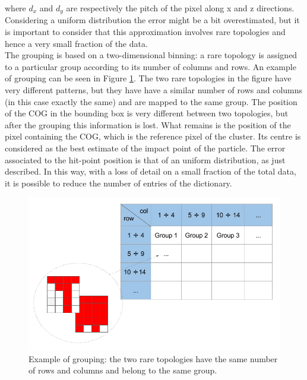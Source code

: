 where $d_x$ and $d_y$ are respectively the pitch of the pixel along x and z directions.
Considering a uniform distribution the error might be a bit overestimated, but it is important to consider that this approximation involves rare topologies and hence a very small fraction of the data.\\
The grouping is based on a two-dimensional binning: a rare topology is assigned to a particular group according to its number of columns and rows. An example of grouping can be seen in Figure \ref{fig:gruppi}. The two rare topologies in the figure have very different patterns, but they have have a similar number of rows and columns (in this case exactly the same) and are mapped to the same group. The position of the COG in the bounding box is very different between two topologies, but after the grouping this information is lost. What remains is the position of the pixel containing the COG, which is the reference pixel of the cluster. Its centre is considered as the best estimate of the impact point of the particle. The error associated to the hit-point position is that of an uniform distribution, as just described. In this way, with a loss of detail on a small fraction of the total data, it is possible to reduce the number of entries of the dictionary.
%
\begin{figure}
  \centering
  \includegraphics[scale=0.5]{figures/gruppi.png}
  \caption{Example of grouping: the two rare topologies have the same number of rows and columns and belong to the same group.}
  \label{fig:gruppi}
\end{figure}
%
